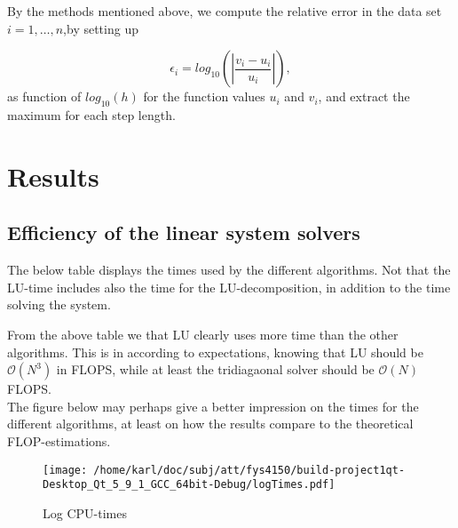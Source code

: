 \documentclass{article}
\begin{document}
By the methods mentioned above, we compute the relative error in the data set $i=1,\dots, n$,by setting up

\[
\epsilon_i=log_{10}\left(\left|\frac{v_i-u_i}
{u_i}\right|\right),
\]
as function of $log_{10}(h)$ for the function values $u_i$ and $v_i$, and extract the maximum for each step length.

\section{Results}

\subsection{Efficiency of the linear system solvers}
The below table displays the times used by the different algorithms. Not that the LU-time includes also the time for the LU-decomposition, in addition to the time solving the system.

\begin{minipage}{.32\textwidth} %
	
\end{minipage}\hfill
\begin{minipage}{.32\textwidth}
	
\end{minipage}\hfill
\begin{minipage}{.32\textwidth}
	
\end{minipage}\hfill

From the above table we that LU clearly uses more time than the other algorithms. This is in according to expectations, knowing that LU should be $\mathcal{O}(N^3)$ in FLOPS, while at least the tridiagaonal solver should be $\mathcal{O}(N)$ FLOPS.\\

The figure below may perhaps give a better impression on the times for the different algorithms, at least on how the results compare to the theoretical FLOP-estimations.

\begin{figure}[H]
	\centering
	\texttt{[image: /home/karl/doc/subj/att/fys4150/build-project1qt-Desktop\_Qt\_5\_9\_1\_GCC\_64bit-Debug/logTimes.pdf]}
	\caption{Log CPU-times}
\end{figure}
\end{document}

